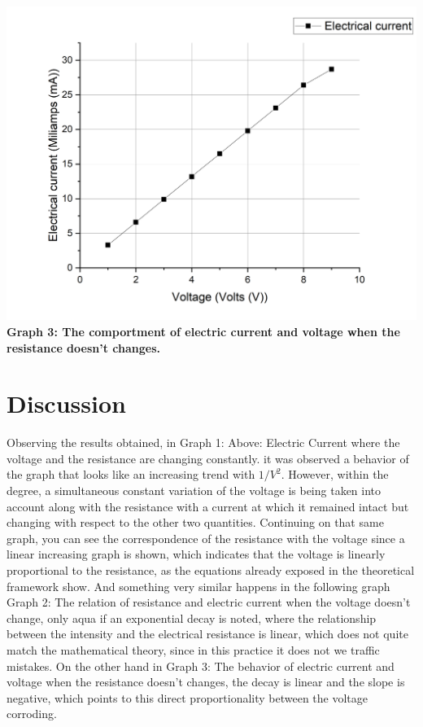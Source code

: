 \documentclass[a4paper,10pt]{article}
\begin{document}
\begin{multicols}{2}
\begin{center}
    \includegraphics[scale=0.3]{Images/Graph3.png}
    \textcolor{MiColor2}{\textbf{Graph 3: The comportment of electric current and voltage when the resistance doesn't changes.}}
\end{center}



\section{\textcolor{MiColor1}{\textbf{Discussion}}}
Observing the results obtained, in Graph 1:
Above: Electric Current where the voltage and
the resistance are changing constantly.
it was observed a behavior of the graph that looks like an increasing trend with $1 / V ^ 2$.  However, within the degree, a simultaneous constant variation of the voltage is being taken into account along with the resistance with a current at which it remained intact but changing with respect to the other two quantities. Continuing on that same graph, you can see the correspondence of the resistance with the voltage since a linear increasing graph is shown, which indicates that the voltage is linearly proportional to the resistance, as the equations already exposed in the theoretical framework show. And something very similar happens in the following graph Graph 2: The relation of resistance and electric
current when the voltage doesn't change, only aqua if an exponential decay is noted, where the relationship between the intensity and the electrical resistance is linear, which does not quite match the mathematical theory, since in this practice it does not we traffic mistakes. On the other hand in Graph 3: The behavior of electric current
and voltage when the resistance doesn’t
changes, the decay is linear and the slope is negative, which points to this direct proportionality between the voltage corroding.

\end{multicols}
\end{document}
